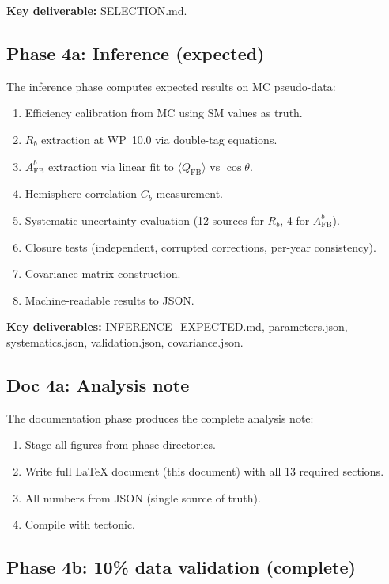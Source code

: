 \documentclass[11pt,a4paper]{article}
\begin{document}
\textbf{Key deliverable:} SELECTION.md.

\subsection{Phase 4a: Inference (expected)}

The inference phase computes expected results on MC pseudo-data:
\begin{enumerate}
\item Efficiency calibration from MC using SM values as truth.
\item $R_b$ extraction at WP~10.0 via double-tag equations.
\item $A_\mathrm{FB}^b$ extraction via linear fit to $\langle Q_\mathrm{FB} \rangle$
vs $\cos\theta$.
\item Hemisphere correlation $C_b$ measurement.
\item Systematic uncertainty evaluation (12 sources for $R_b$, 4 for $A_\mathrm{FB}^b$).
\item Closure tests (independent, corrupted corrections, per-year consistency).
\item Covariance matrix construction.
\item Machine-readable results to JSON.
\end{enumerate}

\textbf{Key deliverables:} INFERENCE\_EXPECTED.md, parameters.json, systematics.json,
validation.json, covariance.json.

\subsection{Doc 4a: Analysis note}

The documentation phase produces the complete analysis note:
\begin{enumerate}
\item Stage all figures from phase directories.
\item Write full LaTeX document (this document) with all 13 required sections.
\item All numbers from JSON (single source of truth).
\item Compile with tectonic.
\end{enumerate}

\subsection{Phase 4b: 10\% data validation (complete)}
\end{document}
